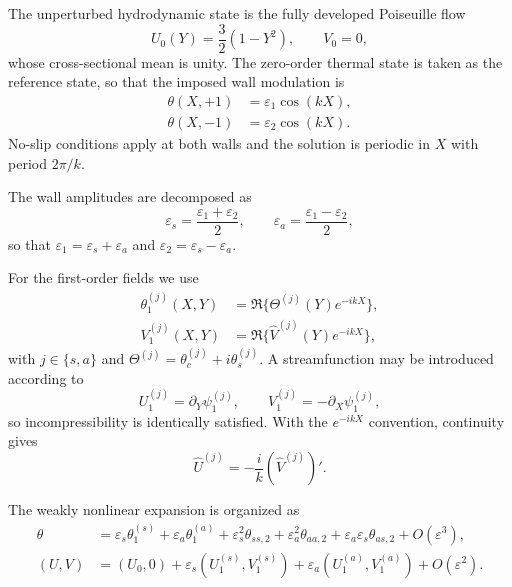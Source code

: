 \documentclass[12pt,a4paper]{article}
\begin{document}
The unperturbed hydrodynamic state is the fully developed Poiseuille flow
\begin{equation}
  U_0(Y)=\frac32(1-Y^2),\qquad V_0=0,
  \label{eq:base_flow}
\end{equation}
whose cross-sectional mean is unity. The zero-order thermal state is taken as the reference state,
so that the imposed wall modulation is
\begin{align}
  \theta(X,+1)&=\varepsilon_1\cos(kX),\\
  \theta(X,-1)&=\varepsilon_2\cos(kX).
\end{align}
No-slip conditions apply at both walls and the solution is periodic in $X$ with period $2\pi/k$.

The wall amplitudes are decomposed as
\begin{equation}
  \varepsilon_s=\frac{\varepsilon_1+\varepsilon_2}{2},\qquad
  \varepsilon_a=\frac{\varepsilon_1-\varepsilon_2}{2},
  \label{eq:eps_decomp}
\end{equation}
so that $\varepsilon_1=\varepsilon_s+\varepsilon_a$ and
$\varepsilon_2=\varepsilon_s-\varepsilon_a$.

For the first-order fields we use
\begin{align}
  \theta_1^{(j)}(X,Y)&=\Re\{\Theta^{(j)}(Y)e^{-ikX}\},\\
  V_1^{(j)}(X,Y)&=\Re\{\widehat V^{(j)}(Y)e^{-ikX}\},
\end{align}
with $j\in\{s,a\}$ and $\Theta^{(j)}=\theta_c^{(j)}+i\theta_s^{(j)}$. A streamfunction may be
introduced according to
\begin{equation}
  U_1^{(j)}=\partial_Y\psi_1^{(j)},\qquad
  V_1^{(j)}=-\partial_X\psi_1^{(j)},
\end{equation}
so incompressibility is identically satisfied. With the $e^{-ikX}$ convention, continuity gives
\begin{equation}
  \widehat U^{(j)}=-\frac{i}{k}(\widehat V^{(j)})'.
  \label{eq:U_from_V}
\end{equation}

The weakly nonlinear expansion is organized as
\begin{align}
  \theta &= \varepsilon_s\theta_1^{(s)}+\varepsilon_a\theta_1^{(a)}
  +\varepsilon_s^2\theta_{ss,2}+\varepsilon_a^2\theta_{aa,2}
  +\varepsilon_a\varepsilon_s\theta_{as,2}+O(\varepsilon^3),\\
  (U,V)&=(U_0,0)+\varepsilon_s(U_1^{(s)},V_1^{(s)})
  +\varepsilon_a(U_1^{(a)},V_1^{(a)})+O(\varepsilon^2).
  \label{eq:weak_expansion}
\end{align}
\end{document}
